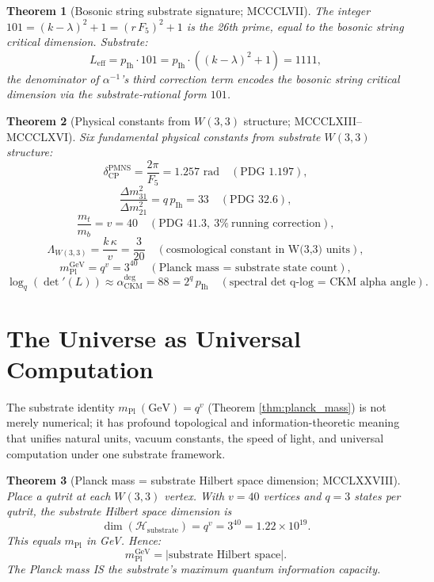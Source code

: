 \documentclass[11pt]{article}
\newtheorem{theorem}{Theorem}[section]
\begin{document}
\begin{theorem}[Bosonic string substrate signature; MCCCLVII]\label{thm:101_bosonic}
The integer $101 = (k - \lambda)^2 + 1 = (r\,F_5)^2 + 1$ is the 26th
prime, equal to the bosonic string critical dimension.  Substrate:
\[
  L_{\mathrm{eff}} = p_{\mathrm{Ih}} \cdot 101 = p_{\mathrm{Ih}} \cdot ((k-\lambda)^2+1) = 1111,
\]
the denominator of $\alpha^{-1}$'s third correction term encodes the
bosonic string critical dimension via the substrate-rational form $101$.
\end{theorem}

\begin{theorem}[Physical constants from $W(3,3)$ structure; MCCCLXIII--MCCCLXVI]\label{thm:six_physical}
Six fundamental physical constants from substrate $W(3,3)$ structure:
\[
  \delta_{\mathrm{CP}}^{\mathrm{PMNS}} = \frac{2\pi}{F_5} = 1.257 \text{ rad}
  \quad (\text{PDG } 1.197),
\]
\[
  \frac{\Delta m^2_{31}}{\Delta m^2_{21}} = q\,p_{\mathrm{Ih}} = 33
  \quad (\text{PDG } 32.6),
\]
\[
  \frac{m_t}{m_b} = v = 40
  \quad (\text{PDG } 41.3,\ 3\%\ \text{running correction}),
\]
\[
  \Lambda_{W(3,3)} = \frac{k\,\kappa}{v} = \frac{3}{20}
  \quad (\text{cosmological constant in W(3,3) units}),
\]
\[
  m_{\mathrm{Pl}}^{\mathrm{GeV}} = q^v = 3^{40}
  \quad (\text{Planck mass = substrate state count}),
\]
\[
  \log_q(\det'(L)) \approx \alpha_{\mathrm{CKM}}^{\text{deg}} = 88 = 2^q\,p_{\mathrm{Ih}}
  \quad (\text{spectral det q-log = CKM alpha angle}).
\]
\end{theorem}

\section{The Universe as Universal Computation}\label{sec:universal_computation}

The substrate identity $m_{\mathrm{Pl}}~(\text{GeV}) = q^v$ (Theorem
\ref{thm:planck_mass}) is not merely numerical; it has profound
topological and information-theoretic meaning that unifies natural
units, vacuum constants, the speed of light, and universal computation
under one substrate framework.

\begin{theorem}[Planck mass = substrate Hilbert space dimension; MCCLXXVIII]\label{thm:info_planck}
Place a qutrit at each $W(3,3)$ vertex.  With $v = 40$ vertices and
$q = 3$ states per qutrit, the substrate Hilbert space dimension is
\[
  \dim(\mathcal H_{\text{substrate}}) = q^v = 3^{40} = 1.22\times 10^{19}.
\]
This \emph{equals} $m_{\mathrm{Pl}}$ in GeV.  Hence:
\[
  m_{\mathrm{Pl}}^{\text{GeV}} = |\text{substrate Hilbert space}|.
\]
The Planck mass IS the substrate's maximum quantum information capacity.
\end{theorem}
\end{document}
